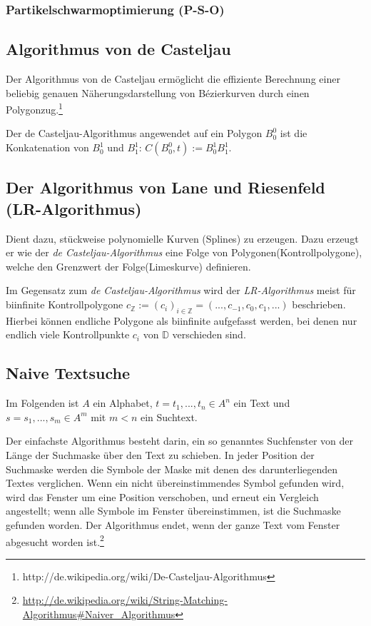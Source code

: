 \subsubsection{Partikelschwarmoptimierung (P-S-O)}



\subsection{Algorithmus von de Casteljau}
Der Algorithmus von de Casteljau ermöglicht die effiziente Berechnung einer beliebig genauen Näherungsdarstellung von Bézierkurven durch einen Polygonzug.\footnote{http://de.wikipedia.org/wiki/De-Casteljau-Algorithmus}

Der de Casteljau-Algorithmus angewendet auf ein Polygon \(B_0^0\) ist die Konkatenation von \(B_0^1\) und \(B_1^1\): \(C(B_0^0,t) := B_0^1 B_1^1\).
\text{}\\



\subsection{Der Algorithmus von Lane und Riesenfeld (LR-Algorithmus)}
Dient dazu, stückweise polynomielle Kurven (Splines) zu erzeugen. Dazu erzeugt er wie der \textit{de Casteljau-Algorithmus} eine Folge von Polygonen(Kontrollpolygone), welche den Grenzwert der Folge(Limeskurve) definieren.

Im Gegensatz zum \textit{de Casteljau-Algorithmus} wird der \textit{LR-Algorithmus} meist für biinfinite Kontrollpolygone \(c_\mathbb{Z} := (c_i)_{i \in \mathbb{Z}} = (...,c_{-1},c_0,c_1,...)\) beschrieben. Hierbei können endliche Polygone als biinfinite aufgefasst werden, bei denen nur endlich viele Kontrollpunkte \(c_i\) von \(\mathbb{D}\) verschieden sind.
\text{}\\



\subsection{Naive Textsuche}
Im Folgenden ist \(A\) ein Alphabet, \(t = t_1,...,t_n \in A^n\) ein Text und \(s = s_1,...,s_m \in A^m\) mit \(m<n\) ein Suchtext.

Der einfachste Algorithmus besteht darin, ein so genanntes Suchfenster von der Länge der Suchmaske über den Text zu schieben. In jeder Position der Suchmaske werden die Symbole der Maske mit denen des darunterliegenden Textes verglichen. Wenn ein nicht übereinstimmendes Symbol gefunden wird, wird das Fenster um eine Position verschoben, und erneut ein Vergleich angestellt; wenn alle Symbole im Fenster übereinstimmen, ist die Suchmaske gefunden worden. Der Algorithmus endet, wenn der ganze Text vom Fenster abgesucht worden ist.\footnote{\url{http://de.wikipedia.org/wiki/String-Matching-Algorithmus\#Naiver_Algorithmus}}
\text{}\\


